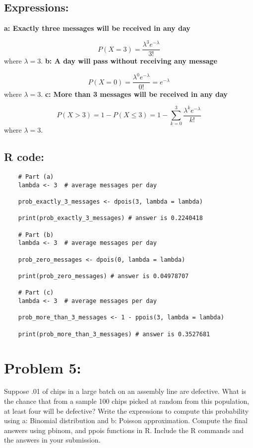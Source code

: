 \documentclass{article}
\begin{document}
\subsection{Expressions:}
\textbf{a: Exactly three messages will be received in any day}

\[
P(X = 3) = \frac{\lambda^3 e^{-\lambda}}{3!}
\]
where \( \lambda = 3 \).
\newline
\newline
\textbf{b: A day will pass without receiving any message}

\[
P(X = 0) = \frac{\lambda^0 e^{-\lambda}}{0!} = e^{-\lambda}
\]
where \( \lambda = 3 \).
\newline
\newline
\textbf{c: More than 3 messages will be received in any day}

\[
P(X > 3) = 1 - P(X \leq 3) = 1 - \sum_{k=0}^{3} \frac{\lambda^k e^{-\lambda}}{k!}
\]
where \( \lambda = 3 \).

\subsection{R code:}
\begin{lstlisting}
    # Part (a)
    lambda <- 3  # average messages per day

    prob_exactly_3_messages <- dpois(3, lambda = lambda)

    print(prob_exactly_3_messages) # answer is 0.2240418

    # Part (b)
    lambda <- 3  # average messages per day

    prob_zero_messages <- dpois(0, lambda = lambda)

    print(prob_zero_messages) # answer is 0.04978707

    # Part (c)
    lambda <- 3  # average messages per day

    prob_more_than_3_messages <- 1 - ppois(3, lambda = lambda)

    print(prob_more_than_3_messages) # answer is 0.3527681

\end{lstlisting}

\section{Problem 5:}
Suppose .01 of chips in a large batch on an assembly line are defective. What is the
chance that from a sample 100 chips picked at random from this population, at least four
will be defective? Write the expressions to compute this probability using a: Binomial
distribution and b: Poisson approximation. Compute the final answers using pbinom, and
ppois functions in R. Include the R commands and the answers in your submission.
\end{document}
